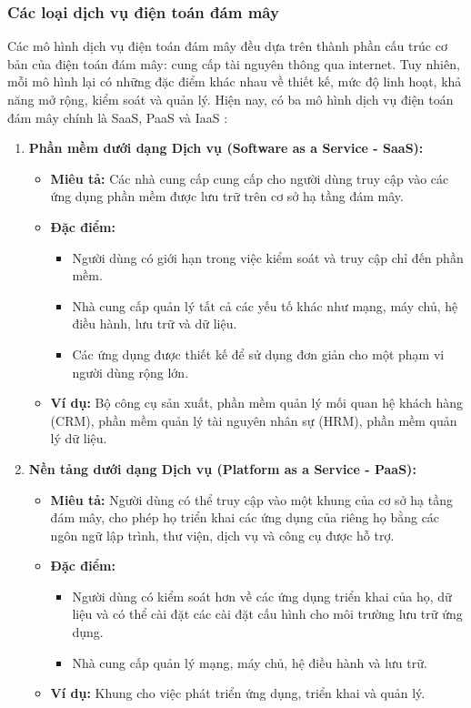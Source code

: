 \subsubsection{Các loại dịch vụ điện toán đám mây}
Các mô hình dịch vụ điện toán đám mây đều dựa trên thành phần cấu trúc cơ bản của điện toán đám mây: cung cấp tài nguyên thông qua internet. Tuy nhiên, mỗi mô hình lại có những đặc điểm khác nhau về thiết kế, mức độ linh hoạt, khả năng mở rộng, kiểm soát và quản lý. Hiện nay, có ba mô hình dịch vụ điện toán đám mây chính là SaaS, PaaS và IaaS \cite{hpe_cloud_services}:
\begin{enumerate}
\item \textbf{Phần mềm dưới dạng Dịch vụ (Software as a Service - SaaS):}
\begin{itemize}
\item \textbf{Miêu tả:} Các nhà cung cấp cung cấp cho người dùng truy cập vào các ứng dụng phần mềm được lưu trữ trên cơ sở hạ tầng đám mây.
    \item \textbf{Đặc điểm:}
        \begin{itemize}
            \item Người dùng có giới hạn trong việc kiểm soát và truy cập chỉ đến phần mềm.
            \item Nhà cung cấp quản lý tất cả các yếu tố khác như mạng, máy chủ, hệ điều hành, lưu trữ và dữ liệu.
            \item Các ứng dụng được thiết kế để sử dụng đơn giản cho một phạm vi người dùng rộng lớn.
        \end{itemize}
        \item \textbf{Ví dụ:} Bộ công cụ sản xuất, phần mềm quản lý mối quan hệ khách hàng (CRM), phần mềm quản lý tài nguyên nhân sự (HRM), phần mềm quản lý dữ liệu.
    \end{itemize}

    \item \textbf{Nền tảng dưới dạng Dịch vụ (Platform as a Service - PaaS):}
    \begin{itemize}
        \item \textbf{Miêu tả:} Người dùng có thể truy cập vào một khung của cơ sở hạ tầng đám mây, cho phép họ triển khai các ứng dụng của riêng họ bằng các ngôn ngữ lập trình, thư viện, dịch vụ và công cụ được hỗ trợ.
        \item \textbf{Đặc điểm:}
        \begin{itemize}
            \item Người dùng có kiểm soát hơn về các ứng dụng triển khai của họ, dữ liệu và có thể cài đặt các cài đặt cấu hình cho môi trường lưu trữ ứng dụng.
            \item Nhà cung cấp quản lý mạng, máy chủ, hệ điều hành và lưu trữ.
        \end{itemize}
        \item \textbf{Ví dụ:} Khung cho việc phát triển ứng dụng, triển khai và quản lý.
    \end{itemize}


\end{enumerate}
